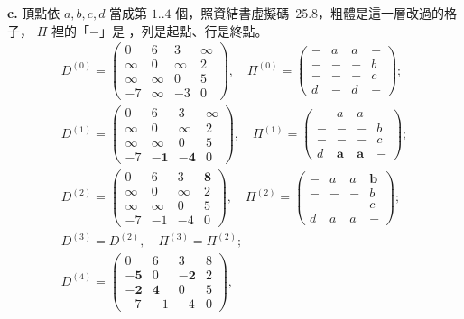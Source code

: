 \begin{pastsoln}
\textbf{c.} 頂點依 $a, b, c, d$ 當成第 $1..4$ 個，照資結書虛擬碼~25.8，粗體是這一層改過的格子，
$\Pi$ 裡的「$-$」是 \NIL，列是起點、行是終點。
\begin{gather*}
D^{(0)} = \begin{pmatrix} 0 & 6 & 3 & \infty \\ \infty & 0 & \infty & 2 \\ \infty & \infty & 0 & 5 \\ -7 & \infty & -3 & 0 \end{pmatrix},\quad
\Pi^{(0)} = \begin{pmatrix} - & a & a & - \\ - & - & - & b \\ - & - & - & c \\ d & - & d & - \end{pmatrix}; \\
D^{(1)} = \begin{pmatrix} 0 & 6 & 3 & \infty \\ \infty & 0 & \infty & 2 \\ \infty & \infty & 0 & 5 \\ -7 & \mathbf{-1} & \mathbf{-4} & 0 \end{pmatrix},\quad
\Pi^{(1)} = \begin{pmatrix} - & a & a & - \\ - & - & - & b \\ - & - & - & c \\ d & \mathbf{a} & \mathbf{a} & - \end{pmatrix}; \\
D^{(2)} = \begin{pmatrix} 0 & 6 & 3 & \mathbf{8} \\ \infty & 0 & \infty & 2 \\ \infty & \infty & 0 & 5 \\ -7 & -1 & -4 & 0 \end{pmatrix},\quad
\Pi^{(2)} = \begin{pmatrix} - & a & a & \mathbf{b} \\ - & - & - & b \\ - & - & - & c \\ d & a & a & - \end{pmatrix}; \\
D^{(3)} = D^{(2)},\quad \Pi^{(3)} = \Pi^{(2)}; \\
D^{(4)} = \begin{pmatrix} 0 & 6 & 3 & 8 \\ \mathbf{-5} & 0 & \mathbf{-2} & 2 \\ \mathbf{-2} & \mathbf{4} & 0 & 5 \\ -7 & -1 & -4 & 0 \end{pmatrix},\quad

\end{gather*}
\end{pastsoln}
